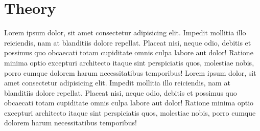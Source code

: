 \section{Theory}
	Lorem ipsum dolor, sit amet consectetur adipisicing elit. Impedit mollitia illo reiciendis, nam at blanditiis dolore repellat. Placeat nisi, neque odio, debitis et possimus quo obcaecati totam cupiditate omnis culpa labore aut dolor! Ratione minima optio excepturi architecto itaque sint perspiciatis quos, molestiae nobis, porro cumque dolorem harum necessitatibus temporibus! Lorem ipsum dolor, sit amet consectetur adipisicing elit. Impedit mollitia illo reiciendis, nam at blanditiis dolore repellat. Placeat nisi, neque odio, debitis et possimus quo obcaecati totam cupiditate omnis culpa labore aut dolor! Ratione minima optio excepturi architecto itaque sint perspiciatis quos, molestiae nobis, porro cumque dolorem harum necessitatibus temporibus!
